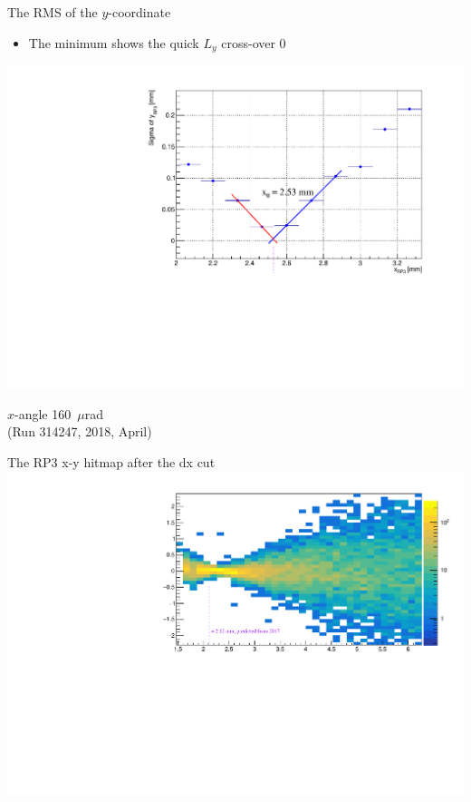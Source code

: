 \documentclass{beamer}
\begin{document}
\begin{frame}\scriptsize
	\begin{block}{The RMS of the $y$-coordinate}
    		\begin{itemize}
			\item The minimum shows the quick $L_{y}$ cross-over 0
		\end{itemize}
             \includegraphics[width=1.0\textwidth]{x0130muradrp3.pdf}\\
	\end{block}
	
\end{frame}


\begin{frame}
	\begin{center}
	\Large
	$x$-angle 160~$\mu$rad	\\ {\small (Run 314247, 2018, April)}
	\end{center}
\end{frame}

\begin{frame}\scriptsize
	\begin{block}{The RP3 x-y hitmap after the dx cut}
             \includegraphics[width=1.0\textwidth]{160murad_neck.pdf}
	\end{block}
	
\end{frame}
\end{document}
